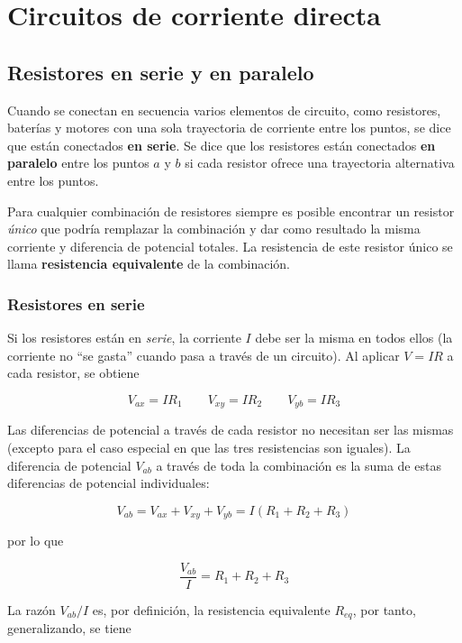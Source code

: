 \chapter{Circuitos de corriente directa}
\section{Resistores en serie y en paralelo}
Cuando se conectan en secuencia varios elementos de circuito, como resistores, baterías y motores con una sola trayectoria de corriente entre los puntos, se dice que están conectados \textbf{en serie}. Se dice que los resistores están conectados \textbf{en paralelo} entre los puntos $a$ y $b$ si cada resistor ofrece una trayectoria alternativa entre los puntos.

Para cualquier combinación de resistores siempre es posible encontrar un resistor \textit{único} que podría remplazar la combinación y dar como resultado la misma corriente y diferencia de potencial totales. La resistencia de este resistor único se llama \textbf{resistencia equivalente} de la combinación.

\subsection{Resistores en serie}
Si los resistores están en \textit{serie}, la corriente $I$ debe ser la misma en todos ellos (la corriente no “se gasta” cuando pasa a través de un circuito). Al aplicar $V=IR$ a cada resistor, se obtiene

\begin{equation*}
V_{ax}=IR_1 \qquad V_{xy}=IR_2 \qquad V_{yb}=IR_3
\end{equation*}

Las diferencias de potencial a través de cada resistor no necesitan ser las mismas (excepto para el caso especial en que las tres resistencias son iguales). La diferencia de potencial $V_{ab}$ a través de toda la combinación es la suma de estas diferencias de potencial individuales:

\begin{equation*}
V_{ab}=V_{ax}+V_{xy}+V_{yb}=I(R_1+R_2+R_3)
\end{equation*}

por lo que 

\begin{equation*}
\frac{V_{ab}}{I}=R_1+R_2+R_3
\end{equation*}

La razón $V_{ab}/I$ es, por definición, la resistencia equivalente $R_{eq}$, por tanto, generalizando, se tiene

